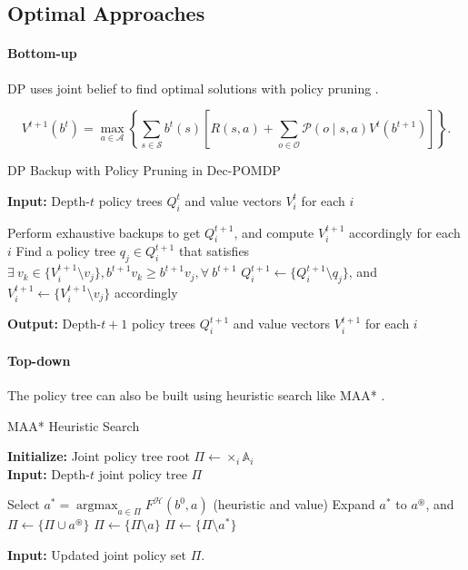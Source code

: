 \documentclass{article} %
\DeclareMathOperator*{\argmax}{argmax}
\begin{document}
\subsection{Optimal Approaches}

\paragraph{Bottom-up} DP uses joint belief to find optimal solutions with policy pruning \cite{hansen2004dynamic}. 

\begin{equation}
    V^{t+1}(b^t) = \max_{a \in \mathcal{A}} \left\{ \sum_{s \in \mathcal{S}} b^t(s) 
\left[ R(s, a) + \sum_{o \in \mathcal{O}} \mathcal{P}(o \mid s, a) V^t(b^{t+1}) \right] \right\}.
\end{equation}

\begin{algorithm}[H]
\caption{DP Backup with Policy Pruning in Dec-POMDP}
\textbf{Input:} Depth-$t$ policy trees $Q_i^t$ and value vectors $V_i^t$ for each $i$
\begin{algorithmic}[1]
\STATE Perform exhaustive backups to get $Q_i^{t+1}$, and compute $V_i^{t+1}$ accordingly for each $i$
\REPEAT
    \STATE Find a policy tree $q_j \in Q_i^{t+1}$ that satisfies $\exists \ v_k \in \{V_i^{t+1} \setminus v_j\},b^{t+1} v_k \geq b^{t+1} v_j, \forall \ b^{t+1}$
    \STATE $Q_i^{t+1} \gets \{Q_i^{t+1} \setminus q_j\}$, and $V_i^{t+1} \gets \{V_i^{t+1} \setminus v_j\}$ accordingly
\end{algorithmic}
\textbf{Output:} Depth-$t+1$ policy trees $Q_i^{t+1}$ and value vectors $V_i^{t+1}$ for each $i$
\end{algorithm}

\paragraph{Top-down} The policy tree can also be built using heuristic search like MAA* \cite{szer2005maa}.
\begin{algorithm}
\caption{MAA* Heuristic Search}
\textbf{Initialize:} Joint policy tree root $\Pi\gets\times_i \mathbb{A}_i$\\
\textbf{Input:} Depth-$t$ joint policy tree $\Pi$
\begin{algorithmic}[1]
    \STATE Select $a^*=\argmax_{a\in \Pi}F^\mathcal{H}(b^0, a)$ (heuristic and value)
    \STATE Expand $a^*$ to $a^\circledast$, and $\Pi \gets \{\Pi \cup  a^\circledast\}$
           \STATE $\Pi \gets \{\Pi \setminus a\}$
    \ENDIF
    \ENDFOR
        \STATE $\Pi \gets \{\Pi \setminus a^*\}$
    \ENDIF
\end{algorithmic}
\textbf{Input:} Updated joint policy set $\Pi$.
\end{algorithm}
\end{document}
